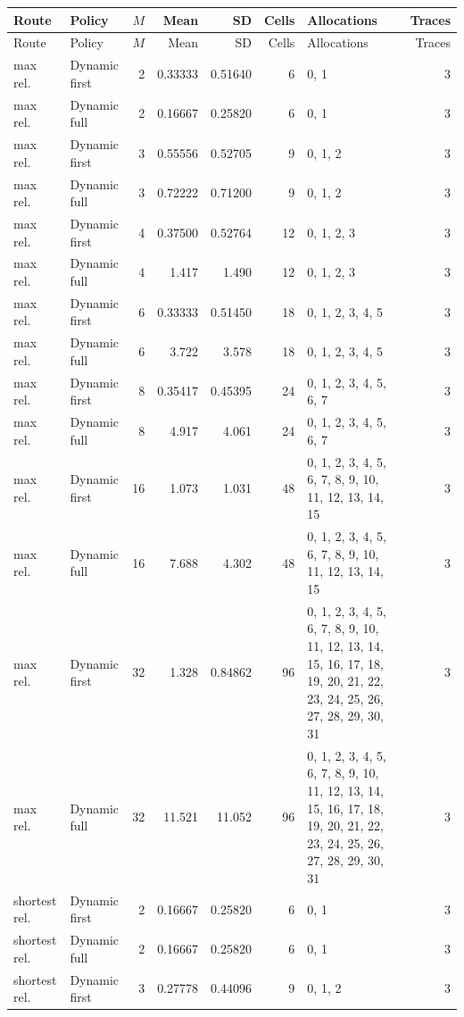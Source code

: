\documentclass[10pt,a4paper]{article}
\begin{document}
\tiny\setlength{\tabcolsep}{2pt}\begin{longtable}{@{}p{23mm}p{29mm}rrrrp{36mm}r@{}}
\toprule Route & Policy & $M$ & Mean & SD & Cells & Allocations & Traces \\ \midrule\endfirsthead
\toprule Route & Policy & $M$ & Mean & SD & Cells & Allocations & Traces \\ \midrule\endhead
\bottomrule\endfoot
max rel. & Dynamic first & 2 & 0.33333 & 0.51640 & 6 & 0, 1 & 3 \\
max rel. & Dynamic full & 2 & 0.16667 & 0.25820 & 6 & 0, 1 & 3 \\
max rel. & Dynamic first & 3 & 0.55556 & 0.52705 & 9 & 0, 1, 2 & 3 \\
max rel. & Dynamic full & 3 & 0.72222 & 0.71200 & 9 & 0, 1, 2 & 3 \\
max rel. & Dynamic first & 4 & 0.37500 & 0.52764 & 12 & 0, 1, 2, 3 & 3 \\
max rel. & Dynamic full & 4 & 1.417 & 1.490 & 12 & 0, 1, 2, 3 & 3 \\
max rel. & Dynamic first & 6 & 0.33333 & 0.51450 & 18 & 0, 1, 2, 3, 4, 5 & 3 \\
max rel. & Dynamic full & 6 & 3.722 & 3.578 & 18 & 0, 1, 2, 3, 4, 5 & 3 \\
max rel. & Dynamic first & 8 & 0.35417 & 0.45395 & 24 & 0, 1, 2, 3, 4, 5, 6, 7 & 3 \\
max rel. & Dynamic full & 8 & 4.917 & 4.061 & 24 & 0, 1, 2, 3, 4, 5, 6, 7 & 3 \\
max rel. & Dynamic first & 16 & 1.073 & 1.031 & 48 & 0, 1, 2, 3, 4, 5, 6, 7, 8, 9, 10, 11, 12, 13, 14, 15 & 3 \\
max rel. & Dynamic full & 16 & 7.688 & 4.302 & 48 & 0, 1, 2, 3, 4, 5, 6, 7, 8, 9, 10, 11, 12, 13, 14, 15 & 3 \\
max rel. & Dynamic first & 32 & 1.328 & 0.84862 & 96 & 0, 1, 2, 3, 4, 5, 6, 7, 8, 9, 10, 11, 12, 13, 14, 15, 16, 17, 18, 19, 20, 21, 22, 23, 24, 25, 26, 27, 28, 29, 30, 31 & 3 \\
max rel. & Dynamic full & 32 & 11.521 & 11.052 & 96 & 0, 1, 2, 3, 4, 5, 6, 7, 8, 9, 10, 11, 12, 13, 14, 15, 16, 17, 18, 19, 20, 21, 22, 23, 24, 25, 26, 27, 28, 29, 30, 31 & 3 \\
shortest rel. & Dynamic first & 2 & 0.16667 & 0.25820 & 6 & 0, 1 & 3 \\
shortest rel. & Dynamic full & 2 & 0.16667 & 0.25820 & 6 & 0, 1 & 3 \\
shortest rel. & Dynamic first & 3 & 0.27778 & 0.44096 & 9 & 0, 1, 2 & 3 \\

\end{longtable}
\end{document}
